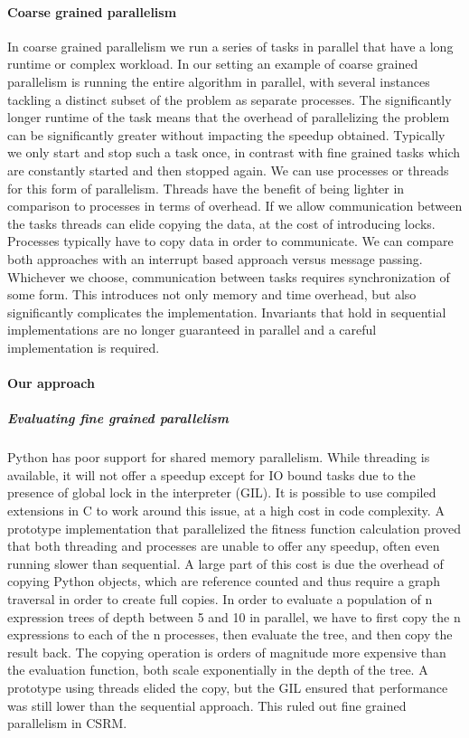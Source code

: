 \paragraph{Coarse grained parallelism}
In coarse grained parallelism we run a series of tasks in parallel that have a long runtime or complex workload. In our setting an example of coarse grained parallelism is running the entire algorithm in parallel, with several instances tackling a distinct subset of the problem as separate processes. The significantly longer runtime of the task means that the overhead of parallelizing the problem can be significantly greater without impacting the speedup obtained. Typically we only start and stop such a task once, in contrast with fine grained tasks which are constantly started and then stopped again. We can use processes or threads for this form of parallelism. Threads have the benefit of being lighter in comparison to processes in terms of overhead. If we allow communication between the tasks threads can elide copying the data, at the cost of introducing locks. Processes typically have to copy data in order to communicate. We can compare both approaches with an interrupt based approach versus message passing. Whichever we choose, communication between tasks requires synchronization of some form. This introduces not only memory and time overhead, but also significantly complicates the implementation. Invariants that hold in sequential implementations are no longer guaranteed in parallel and a careful implementation is required. 

\paragraph{Our approach}

\subparagraph{Evaluating fine grained parallelism}
Python has poor support for shared memory parallelism. While threading is available, it will not offer a speedup except for IO bound tasks due to the presence of global lock in the interpreter (GIL). It is possible to use compiled extensions in C to work around this issue, at a high cost in code complexity. A prototype implementation that parallelized the fitness function calculation proved that both threading and processes are unable to offer any speedup, often even running slower than sequential. A large part of this cost is due the overhead of copying Python objects, which are reference counted and thus require a graph traversal in order to create full copies. In order to evaluate a population of n expression trees of depth between 5 and 10 in parallel, we have to first copy the n expressions to each of the n processes, then evaluate the tree, and then copy the result back. The copying operation is orders of magnitude more expensive than the evaluation function, both scale exponentially in the depth of the tree. A prototype using threads elided the copy, but the GIL ensured that performance was still lower than the sequential approach.
This ruled out fine grained parallelism in CSRM.

